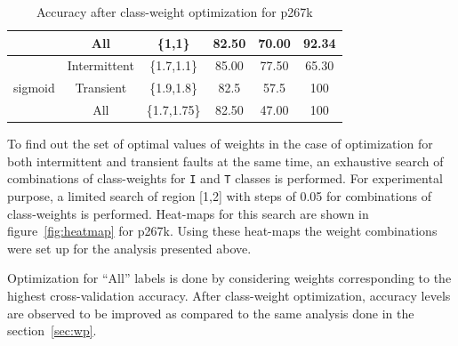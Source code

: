 \begin{table}[h]
\begin{tabular}{cccccc}
                            & All                               & \{1,1\}                                           & 82.50          & 70.00           & 92.34                        \\
\hline
\multirow{3}{*}{sigmoid}    & Intermittent                            & \{1.7,1.1\}                                       & 85.00          & 77.50           & 65.30                      \\
                            & Transient                               & \{1.9,1.8\}                                       & 82.5           & 57.5            & 100                       \\

                            & All                               & \{1.7,1.75\}                                           & 82.50          & 47.00           & 100                        \\
\hline
\end{tabular}
\caption{Accuracy after class-weight optimization for p267k}
\label{tab:optp267k}
\end{table}

To find out the set of optimal values of weights in the case of optimization for both intermittent and transient faults at the same time, an exhaustive search of combinations of class-weights for \texttt{I} and \texttt{T} classes is performed. For experimental purpose, a limited search of region [1,2] with steps of 0.05 for combinations of class-weights is performed. Heat-maps for this search are shown in figure~\ref{fig:heatmap} for p267k. Using these heat-maps the weight combinations were set up for the analysis presented above.

Optimization for \enquote{All} labels is done by considering weights corresponding to the highest cross-validation accuracy. After class-weight optimization, accuracy levels are observed to be improved as compared to the same analysis done in the section~\ref{sec:wp}.


